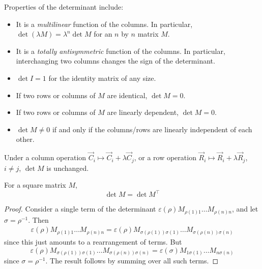 \documentclass{../../template/note}
\begin{document}
    Properties of the determinant include:

    \begin{itemize}
        \item It is a \emph{multilinear} function of the columns. In particular, \(\det(\lambda M) = \lambda^n \det M\) for an \(n\) by \(n\) matrix \(M\).
        \item It is a \emph{totally antisymmetric} function of the columns. In particular, interchanging two columns changes the sign of the determinant.
        \item \(\det I = 1\) for the identity matrix of any size.
        \item If two rows or columns of \(M\) are identical, \(\det M = 0\).
        \item If two rows or columns of \(M\) are linearly dependent, \(\det M = 0\).
        \item \(\det M \neq 0\) if and only if the columns/rows are linearly independent of each other.
    \end{itemize}
    
    \begin{corollary}
        Under a column operation \(\vec C_i \mapsto \vec C_i + \lambda \vec C_j\), or a row operation \(\vec R_i \mapsto \vec R_i + \lambda \vec R_j\), \(i \neq j\), \(\det M\) is unchanged.
    \end{corollary}
    
    \begin{proposition}
        For a square matrix \(M\),
        \[
            \det M = \det M^\intercal
        \]
    \end{proposition}
    
    \begin{proof}
        Consider a single term of the determinant \(\varepsilon(\rho) M_{\rho(1)1}\dots M_{\rho(n)n}\), and let \(\sigma = \rho^{-1}\). Then
        \begin{align*}
            \varepsilon(\rho)M_{\rho(1)1}\dots M_{\rho(n)n} = \varepsilon(\rho)M_{\sigma(\rho(1))\sigma(1)}\dots M_{\sigma(\rho(n))\sigma(n)}
        \end{align*}
        since this just amounts to a rearrangement of terms. But 
        \[
            \varepsilon(\rho)M_{\sigma(\rho(1))\sigma(1)}\dots M_{\sigma(\rho(n))\sigma(n)} = \varepsilon(\sigma)M_{1\sigma(1)}\dots M_{n\sigma(n)}
        \]
        since \(\sigma = \rho^{-1}\). The result follows by summing over all such terms.
    \end{proof}
    
\end{document}
